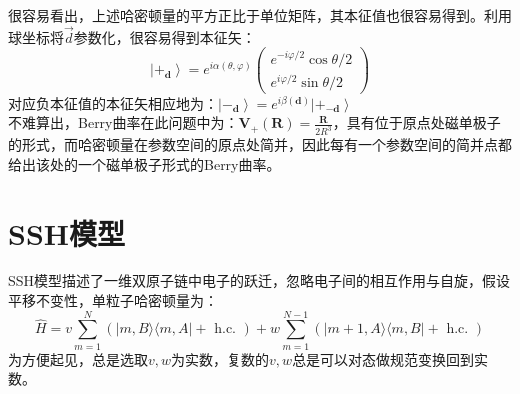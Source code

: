 \documentclass[12pt, a4paper, oneside]{ctexbook}
\begin{document}
很容易看出，上述哈密顿量的平方正比于单位矩阵，其本征值也很容易得到。利用球坐标将$ \vec{d} $参数化，很容易得到本征矢：
\begin{equation}
	\left|+_{\mathbf{d}}\right\rangle=e^{i \alpha(\theta, \varphi)}\left(\begin{array}{c}
		e^{-i \varphi / 2} \cos \theta / 2 \\
		e^{i \varphi / 2} \sin \theta / 2
		\end{array}\right)
\end{equation}   
对应负本征值的本征矢相应地为：$ \left|-_{\mathbf{d}}\right\rangle=e^{i \beta(\mathbf{d})}\left|+_{-\mathbf{d}}\right\rangle $\\
不难算出，Berry曲率在此问题中为：$ \mathbf{V}_{+}(\mathbf{R})=\frac{\mathbf{R}}{2 R^3} $，具有位于原点处磁单极子的形式，而哈密顿量在参数空间的原点处简并，因此每有一个参数空间的简并点都给出该处的一个磁单极子形式的Berry曲率。 
\chapter{SSH模型}
SSH模型描述了一维双原子链中电子的跃迁，忽略电子间的相互作用与自旋，假设平移不变性，单粒子哈密顿量为：
\begin{equation}
	\hat{H}=v \sum_{m=1}^N(|m, B\rangle\langle m, A|+\text { h.c. })+w \sum_{m=1}^{N-1}(|m+1, A\rangle\langle m, B|+\text { h.c. })
\end{equation}
为方便起见，总是选取$ v,w $为实数，复数的$ v,w $总是可以对态做规范变换回到实数。\\
\end{document}
